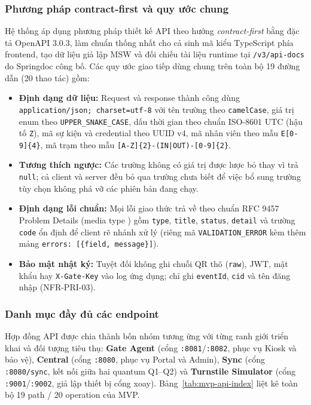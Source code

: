 \subsubsection{Phương pháp contract-first và quy ước chung}

Hệ thống áp dụng phương pháp thiết kế API theo hướng \textit{contract-first} bằng đặc tả OpenAPI
3.0.3, làm chuẩn thống nhất cho cả sinh mã kiểu TypeScript phía frontend, tạo dữ liệu giả lập MSW và
đối chiếu tài liệu runtime tại \texttt{/v3/api-docs} do Springdoc công bố. Các quy ước giao tiếp dùng
chung trên toàn bộ 19 đường dẫn (20 thao tác) gồm:
\begin{itemize}
    \item \textbf{Định dạng dữ liệu:} Request và response thành công dùng
    \texttt{application/json; charset=utf-8} với tên trường theo \texttt{camelCase}, giá trị enum
    theo \texttt{UPPER\_SNAKE\_CASE}, dấu thời gian theo chuẩn ISO-8601 UTC (hậu tố \texttt{Z}), mã
    sự kiện và credential theo UUID v4, mã nhân viên theo mẫu \texttt{E[0-9]\{4\}}, mã trạm theo mẫu
    \texttt{[A-Z]\{2\}-(IN|OUT)-[0-9]\{2\}}.
    \item \textbf{Tương thích ngược:} Các trường không có giá trị được lược bỏ thay vì trả
    \texttt{null}; cả client và server đều bỏ qua trường chưa biết để việc bổ sung trường tùy chọn
    không phá vỡ các phiên bản đang chạy.
    \item \textbf{Định dạng lỗi chuẩn:} Mọi lỗi giao thức trả về theo chuẩn RFC 9457 Problem Details
    (media type ) gồm \texttt{type}, \texttt{title}, \texttt{status},
    \texttt{detail} và trường \texttt{code} ổn định để client rẽ nhánh xử lý (riêng mã
    \texttt{VALIDATION\_ERROR} kèm thêm mảng \texttt{errors: [\{field, message\}]}).
    \item \textbf{Bảo mật nhật ký:} Tuyệt đối không ghi chuỗi QR thô (\texttt{raw}), JWT, mật khẩu
    hay \texttt{X-Gate-Key} vào log ứng dụng; chỉ ghi \texttt{eventId}, \texttt{cid} và tên đăng nhập
    (NFR-PRI-03).
\end{itemize}

\subsubsection{Danh mục đầy đủ các endpoint}

Hợp đồng API được chia thành bốn nhóm tương ứng với từng ranh giới triển khai và đối tượng tiêu thụ:
\textbf{Gate Agent} (cổng \texttt{:8081}/\texttt{:8082}, phục vụ Kiosk và bảo vệ), \textbf{Central}
(cổng \texttt{:8080}, phục vụ Portal và Admin), \textbf{Sync} (cổng \texttt{:8080/sync}, kết nối giữa
hai quantum Q1--Q2) và \textbf{Turnstile Simulator} (cổng \texttt{:9001}/\texttt{:9002}, giả lập
thiết bị cổng xoay). Bảng~\ref{tab:mvp-api-index} liệt kê toàn bộ 19 path / 20 operation của MVP.

